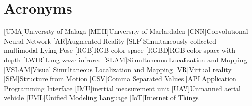 \section*{Acronyms}
\begin{acronym}[MPC] %
    [UMA]{University of Malaga}
    [MDH]{University of Märlardalen}
    [CNN]{Convolutional Neural Network}
    [AR]{Augmented Reality}
    [SLP]{Simultaneously-collected multimodal Lying Pose}
    [RGB]{RGB color space}
    [RGBD]{RGB color space with depth}
    [LWIR]{Long-wave infrared}
    [SLAM]{Simultaneous Localization and Mapping}
    [VSLAM]{Visual Simultaneous Localization and Mapping}
    [VR]{Virtual reality}
    [SfM]{Structure from Motion}
    [CSV]{Comma Separated Values}
    [API]{Application Programming Interface}
    [IMU]{inertial measurement unit}
    [UAV]{Unmanned aerial vehicle}
    [UML]{Unified Modeling Language}
    [IoT]{Internet of Things}
\end{acronym}

\newpage